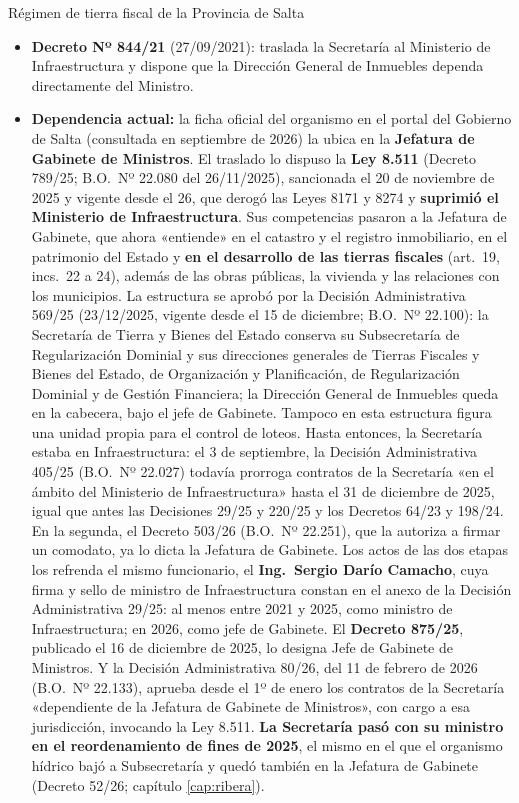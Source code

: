 \begin{ficha}{Régimen de tierra fiscal de la Provincia de Salta}
\begin{itemize}[leftmargin=*,nosep]
\item \textbf{Decreto Nº 844/21} (27/09/2021): traslada la Secretaría al Ministerio de Infraestructura y dispone que la Dirección General de Inmuebles dependa directamente del Ministro.
\item \textbf{Dependencia actual:} la ficha oficial del organismo en el portal del Gobierno de Salta (consultada en septiembre de 2026) la ubica en la \textbf{Jefatura de Gabinete de Ministros}. El traslado lo dispuso la \textbf{Ley 8.511} (Decreto 789/25; B.O.\ Nº 22.080 del 26/11/2025), sancionada el 20 de noviembre de 2025 y vigente desde el 26, que derogó las Leyes 8171 y 8274 y \textbf{suprimió el Ministerio de Infraestructura}. Sus competencias pasaron a la Jefatura de Gabinete, que ahora «entiende» en el catastro y el registro inmobiliario, en el patrimonio del Estado y \textbf{en el desarrollo de las tierras fiscales} (art.\ 19, incs.\ 22 a 24), además de las obras públicas, la vivienda y las relaciones con los municipios. La estructura se aprobó por la Decisión Administrativa 569/25 (23/12/2025, vigente desde el 15 de diciembre; B.O.\ Nº 22.100): la Secretaría de Tierra y Bienes del Estado conserva su Subsecretaría de Regularización Dominial y sus direcciones generales de Tierras Fiscales y Bienes del Estado, de Organización y Planificación, de Regularización Dominial y de Gestión Financiera; la Dirección General de Inmuebles queda en la cabecera, bajo el jefe de Gabinete. Tampoco en esta estructura figura una unidad propia para el control de loteos. Hasta entonces, la Secretaría estaba en Infraestructura: el 3 de septiembre, la Decisión Administrativa 405/25 (B.O.\ Nº 22.027) todavía prorroga contratos de la Secretaría «en el ámbito del Ministerio de Infraestructura» hasta el 31 de diciembre de 2025, igual que antes las Decisiones 29/25 y 220/25 y los Decretos 64/23 y 198/24. En la segunda, el Decreto 503/26 (B.O.\ Nº 22.251), que la autoriza a firmar un comodato, ya lo dicta la Jefatura de Gabinete. Los actos de las dos etapas los refrenda el mismo funcionario, el \textbf{Ing.\ Sergio Darío Camacho}, cuya firma y sello de ministro de Infraestructura constan en el anexo de la Decisión Administrativa 29/25: al menos entre 2021 y 2025, como ministro de Infraestructura; en 2026, como jefe de Gabinete. El \textbf{Decreto 875/25}, publicado el 16 de diciembre de 2025, lo designa Jefe de Gabinete de Ministros. Y la Decisión Administrativa 80/26, del 11 de febrero de 2026 (B.O.\ Nº 22.133), aprueba desde el 1º de enero los contratos de la Secretaría «dependiente de la Jefatura de Gabinete de Ministros», con cargo a esa jurisdicción, invocando la Ley 8.511. \textbf{La Secretaría pasó con su ministro en el reordenamiento de fines de 2025}, el mismo en el que el organismo hídrico bajó a Subsecretaría y quedó también en la Jefatura de Gabinete (Decreto 52/26; capítulo \ref{cap:ribera}).
\end{itemize}
\end{ficha}

